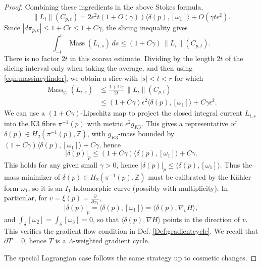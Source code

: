 \documentclass{article}
\theoremstyle{definition}
\newcommand{\Z}{\mathbb{Z}}
\newcommand{\norm}[1]{\left\lVert#1\right\rVert}
\begin{document}
\begin{proof}
			Combining these ingredients in the above Stokes formula,
			\begin{equation}\label{eqn:massincylinder}
			\norm{L_i}(  C_{p,t}   )= 2\epsilon^2 t (1+ O(\gamma ) ) \langle \delta(p) , [\omega_1] \rangle + O(\gamma  t \epsilon^2) .
			\end{equation}
		Since $|d\pi_{p,v}|\leq 1+Cr\leq 1+C\gamma$, the slicing inequality gives
				\[
				\int_{-t}^{t}\operatorname{Mass}(L_{i,s})\,ds
				\leq (1+C\gamma)\,\norm{L_i}(C_{p,t}).
				\]
				There is no factor $2t$ in this coarea estimate. Dividing by the length $2t$ of the slicing interval only when taking the average, and then using \eqref{eqn:massincylinder}, we obtain a slice with $|s|<t<r$ for which
				\[
				\begin{split}
					\operatorname{Mass}_{g_\epsilon}(L_{i,s})
					&\leq \frac{1+C\gamma}{2t}\,\norm{L_i}(C_{p,t})\\
					&\leq (1+C\gamma)\epsilon^2\langle\delta(p),[\omega_1]\rangle
					+C\gamma\epsilon^2.
				\end{split}
				\]
			We can use a $(1+C\gamma)$-Lipschitz map to project the closed integral current $L_{i,s}$ into the K3 fibre $\pi^{-1}(p)$ with metric $\epsilon^2 g_{K3}$. This gives a representative of $\delta(p)\in H_2(\pi^{-1}(p),\Z )$, with $g_{K3}$-mass bounded by $(1+ C\gamma)\langle \delta(p) , [\omega_1] \rangle + C\gamma $, hence
			\begin{equation*}
	|\delta(p) |_p \leq (1+ C\gamma)\langle \delta(p) , [\omega_1] \rangle + C\gamma .
			\end{equation*}
			This holds for any given small $\gamma>0$, hence 
$
	|\delta(p)|_p \leq  \langle \delta(p) , [\omega_1] \rangle .
$
Thus the mass minimizer of $\delta(p) \in H_2(\pi^{-1}(p),\Z )$ must be calibrated by the K\"ahler form $\omega_1$, so it is an $I_1$-holomorphic curve (possibly with multiplicity). In particular, for $v= \xi(p)= \frac{\partial}{\partial x_1}$, 
\begin{equation}\label{eqn:densitycalibration}
|\delta(p)|_p = \langle \delta(p) , [\omega_1] \rangle = \langle \delta(p), \nabla_v H\rangle ,
\end{equation}
and $\int_\delta [\omega_2]= \int_\delta [\omega_3]=0$, so that $\langle \delta(p), \nabla H\rangle $ points in the direction of $v$. This verifies the gradient flow condition in Def. \ref{Def:gradientcycle}. We recall that $\partial T=0$, hence $T$ is a $\Lambda$-weighted gradient cycle.

The special Lagrangian case follows the same strategy up to cosmetic changes.
		\end{proof}
		
\end{document}

